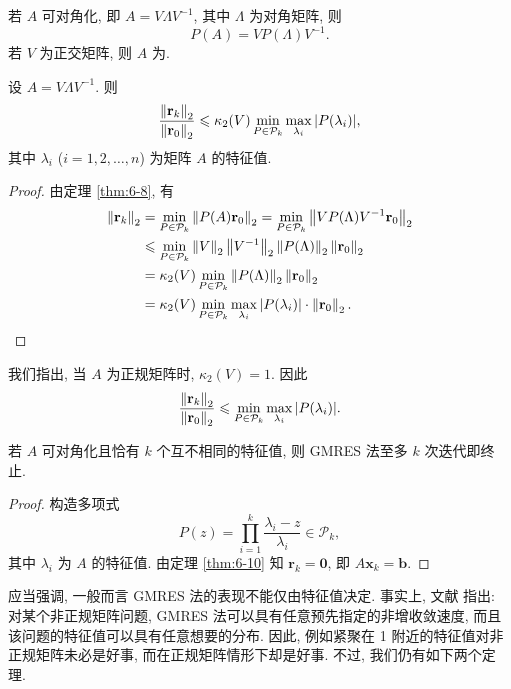 若 $A$ 可对角化, 即 $A=V\Lambda V^{-1}$, 其中 $\Lambda$ 为对角矩阵, 则
\[
  P(A)=VP(\Lambda)V^{-1}.
\]
若 $V$ 为正交矩阵, 则 $A$ 为.

\begin{theorem}
\label{thm:6-10}
设 $A=V\Lambda V^{-1}$. 则
\[
  \frac{\left\|\mathbf{r}_k\right\|_2}{\left\|\mathbf{r}_0\right\|_2}
  \leqslant\kappa_2(V)\min_{P\in\mathcal{P}_k}
  \max_{\lambda_i}|P(\lambda_i)|,
\]
其中 $\lambda_i$ ($i=1,2,\ldots,n$) 为矩阵 $A$ 的特征值.
\end{theorem}

\begin{proof}
由定理 \ref{thm:6-8}, 有
\[
  \begin{aligned}
    \left\|\mathbf{r}_k\right\|_2
    &=\min_{P\in\mathcal{P}_k}\left\|P(A)\mathbf{r}_0\right\|_2
     =\min_{P\in\mathcal{P}_k}\left\|VP(\Lambda)V^{-1}\mathbf{r}_0\right\|_2\\
    &\leqslant\min_{P\in\mathcal{P}_k}\left\|V\right\|_2\left\|V^{-1}\right\|_2
      \left\|P(\Lambda)\right\|_2\left\|\mathbf{r}_0\right\|_2\\
    &=\kappa_2(V)\min_{P\in\mathcal{P}_k}\left\|P(\Lambda)\right\|_2
      \left\|\mathbf{r}_0\right\|_2\\
    &=\kappa_2(V)\min_{P\in\mathcal{P}_k}\max_{\lambda_i}|P(\lambda_i)|
      \cdot\left\|\mathbf{r}_0\right\|_2.
  \end{aligned}
\]
\end{proof}

我们指出, 当 $A$ 为正规矩阵时, $\kappa_2(V)=1$. 因此
\[
  \frac{\left\|\mathbf{r}_k\right\|_2}{\left\|\mathbf{r}_0\right\|_2}
  \leqslant\min_{P\in\mathcal{P}_k}\max_{\lambda_i}|P(\lambda_i)|.
\]

\begin{theorem}
\label{thm:6-11}
若 $A$ 可对角化且恰有 $k$ 个互不相同的特征值, 则 GMRES 法至多 $k$ 次迭代即终止.
\end{theorem}

\begin{proof}
构造多项式
\[
  P(z)=\prod_{i=1}^{k}\frac{\lambda_i-z}{\lambda_i}\in\mathcal{P}_k,
\]
其中 $\lambda_i$ 为 $A$ 的特征值. 由定理 \ref{thm:6-10} 知 $\mathbf{r}_k=\mathbf{0}$, 即 $A\mathbf{x}_k=\mathbf{b}$.
\end{proof}

应当强调, 一般而言 GMRES 法的表现不能仅由特征值决定. 事实上, 文献 \cite{src:35} 指出: 对某个非正规矩阵问题, GMRES 法可以具有任意预先指定的非增收敛速度, 而且该问题的特征值可以具有任意想要的分布. 因此, 例如紧聚在 1 附近的特征值对非正规矩阵未必是好事, 而在正规矩阵情形下却是好事. 不过, 我们仍有如下两个定理.

